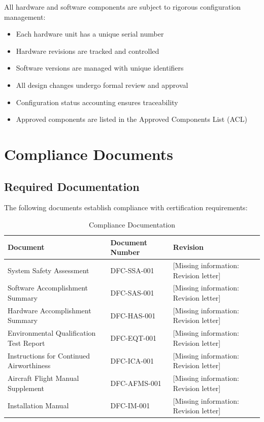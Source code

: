 \documentclass[12pt,a4paper,twoside,openright]{book}
\newcommand{\tabletextfont}{\normalfont\rmfamily}
\newcommand{\tableheadfont}{\normalfont\bfseries}
\begin{document}
All hardware and software components are subject to rigorous configuration management:

\begin{itemize}
    \item Each hardware unit has a unique serial number
    \item Hardware revisions are tracked and controlled
    \item Software versions are managed with unique identifiers
    \item All design changes undergo formal review and approval
    \item Configuration status accounting ensures traceability
    \item Approved components are listed in the Approved Components List (ACL)
\end{itemize}

\section{Compliance Documents}

\subsection{Required Documentation}

The following documents establish compliance with certification requirements:

\begin{table}[h]
\centering
\setlength{\tabcolsep}{5pt} %
\begin{tabular}{|p{}|p{}|p{}|}
\hline
\tableheadfont\textbf{Document} & \tableheadfont\textbf{Document Number} & \tableheadfont\textbf{Revision} \\
\hline
\tabletextfont System Safety Assessment & DFC-SSA-001 & {\color{missingred}[Missing information: Revision letter]} \\
\hline
\tabletextfont Software Accomplishment Summary & DFC-SAS-001 & {\color{missingred}[Missing information: Revision letter]} \\
\hline
\tabletextfont Hardware Accomplishment Summary & DFC-HAS-001 & {\color{missingred}[Missing information: Revision letter]} \\
\hline
\tabletextfont Environmental Qualification Test Report & DFC-EQT-001 & {\color{missingred}[Missing information: Revision letter]} \\
\hline
\tabletextfont Instructions for Continued Airworthiness & DFC-ICA-001 & {\color{missingred}[Missing information: Revision letter]} \\
\hline
\tabletextfont Aircraft Flight Manual Supplement & DFC-AFMS-001 & {\color{missingred}[Missing information: Revision letter]} \\
\hline
\tabletextfont Installation Manual & DFC-IM-001 & {\color{missingred}[Missing information: Revision letter]} \\
\hline
\end{tabular}
\caption{Compliance Documentation}
\end{table}
\end{document}
